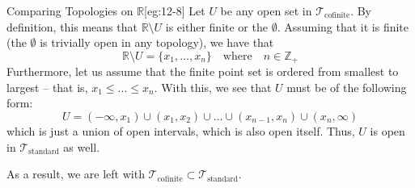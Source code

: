 \begin{egBox}{Comparing Topologies on \( \mathbb{R} \)}[eg:12-8]
    Let \( U \) be any open set in \( \mathcal{T}_{ \mathrm{cofinite} } \).
    By definition, this means that \( \mathbb{R} \setminus U \) is either 
    finite or the \( \emptyset \).
    Assuming that it is finite (the \( \emptyset \) is trivially open in any
    topology), we have that
    \begin{equation*}
        \mathbb{R} \setminus U
        =
        \{ x_{ 1 } , \ldots , x_{ n } \}
        \quad \mathrm{where} \quad 
        n \in \mathbb{Z}_{ + }
    \end{equation*}
    Furthermore, let us assume that the finite point set is ordered from 
    smallest to largest -- that is, \( x_{ 1 } \leq \ldots \leq x_{ n } \).
    With this, we see that \( U \) must be of the following form:
    \begin{equation*}
        U
        =
        ( - \infty, x_{ 1 } ) \cup ( x_{ 1 }, x_{ 2 } ) 
        \cup \ldots \cup 
        ( x_{ n - 1 }, x_{ n } ) \cup ( x_{ n }, \infty )
    \end{equation*}
    which is just a union of open intervals, which is also open itself.
    Thus, \( U \) is open in \( \mathcal{T}_{ \mathrm{standard} } \) as well.

    \baseSkip

    As a result, we are left with \( \mathcal{T}_{ \mathrm{cofinite} } \subset
    \mathcal{T}_{ \mathrm{standard} } \).
\end{egBox}